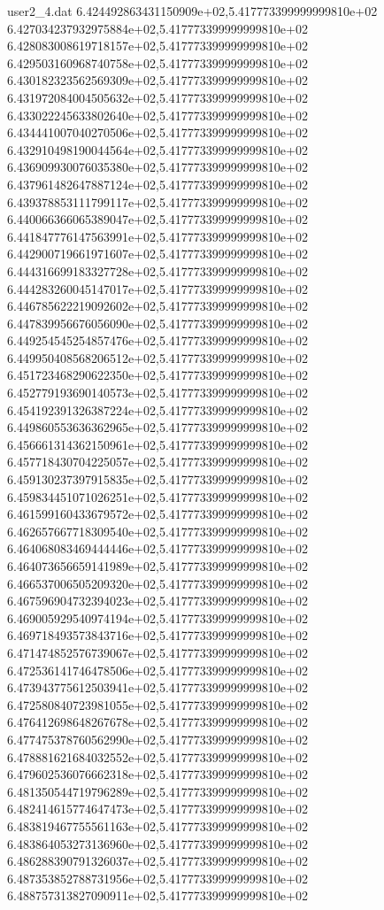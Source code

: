 \begin{filecontents}{user2_4.dat}
6.424492863431150909e+02,5.417773399999999810e+02
6.427034237932975884e+02,5.417773399999999810e+02
6.428083008619718157e+02,5.417773399999999810e+02
6.429503160968740758e+02,5.417773399999999810e+02
6.430182323562569309e+02,5.417773399999999810e+02
6.431972084004505632e+02,5.417773399999999810e+02
6.433022245633802640e+02,5.417773399999999810e+02
6.434441007040270506e+02,5.417773399999999810e+02
6.432910498190044564e+02,5.417773399999999810e+02
6.436909930076035380e+02,5.417773399999999810e+02
6.437961482647887124e+02,5.417773399999999810e+02
6.439378853111799117e+02,5.417773399999999810e+02
6.440066366065389047e+02,5.417773399999999810e+02
6.441847776147563991e+02,5.417773399999999810e+02
6.442900719661971607e+02,5.417773399999999810e+02
6.444316699183327728e+02,5.417773399999999810e+02
6.444283260045147017e+02,5.417773399999999810e+02
6.446785622219092602e+02,5.417773399999999810e+02
6.447839956676056090e+02,5.417773399999999810e+02
6.449254545254857476e+02,5.417773399999999810e+02
6.449950408568206512e+02,5.417773399999999810e+02
6.451723468290622350e+02,5.417773399999999810e+02
6.452779193690140573e+02,5.417773399999999810e+02
6.454192391326387224e+02,5.417773399999999810e+02
6.449860553636362965e+02,5.417773399999999810e+02
6.456661314362150961e+02,5.417773399999999810e+02
6.457718430704225057e+02,5.417773399999999810e+02
6.459130237397915835e+02,5.417773399999999810e+02
6.459834451071026251e+02,5.417773399999999810e+02
6.461599160433679572e+02,5.417773399999999810e+02
6.462657667718309540e+02,5.417773399999999810e+02
6.464068083469444446e+02,5.417773399999999810e+02
6.464073656659141989e+02,5.417773399999999810e+02
6.466537006505209320e+02,5.417773399999999810e+02
6.467596904732394023e+02,5.417773399999999810e+02
6.469005929540974194e+02,5.417773399999999810e+02
6.469718493573843716e+02,5.417773399999999810e+02
6.471474852576739067e+02,5.417773399999999810e+02
6.472536141746478506e+02,5.417773399999999810e+02
6.473943775612503941e+02,5.417773399999999810e+02
6.472580840723981055e+02,5.417773399999999810e+02
6.476412698648267678e+02,5.417773399999999810e+02
6.477475378760562990e+02,5.417773399999999810e+02
6.478881621684032552e+02,5.417773399999999810e+02
6.479602536076662318e+02,5.417773399999999810e+02
6.481350544719796289e+02,5.417773399999999810e+02
6.482414615774647473e+02,5.417773399999999810e+02
6.483819467755561163e+02,5.417773399999999810e+02
6.483864053273136960e+02,5.417773399999999810e+02
6.486288390791326037e+02,5.417773399999999810e+02
6.487353852788731956e+02,5.417773399999999810e+02
6.488757313827090911e+02,5.417773399999999810e+02

\end{filecontents}
